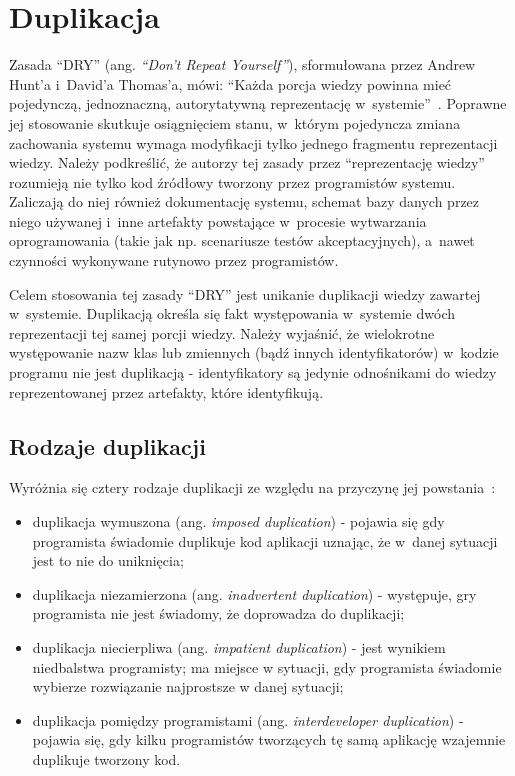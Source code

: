 \chapter{Duplikacja} \label{chap:duplication}

Zasada ``DRY'' (ang. \emph{``Don't Repeat Yourself''}), sformułowana przez Andrew Hunt'a i~David'a Thomas'a, mówi: ``Każda porcja wiedzy powinna mieć pojedynczą, jednoznaczną, autorytatywną reprezentację w~systemie''~\cite{prag_prog:dupl}.
Poprawne jej stosowanie skutkuje osiągnięciem stanu, w~którym pojedyncza zmiana zachowania systemu wymaga modyfikacji tylko jednego fragmentu reprezentacji wiedzy.
Należy podkreślić, że autorzy tej zasady przez ``reprezentację wiedzy'' rozumieją nie tylko kod źródłowy tworzony przez programistów systemu.
Zaliczają do niej również dokumentację systemu, schemat bazy danych przez niego używanej i~inne artefakty powstające w~procesie wytwarzania oprogramowania (takie jak np. scenariusze testów akceptacyjnych), a~nawet czynności wykonywane rutynowo przez programistów.

Celem stosowania tej zasady ``DRY'' jest unikanie duplikacji wiedzy zawartej w~systemie.
Duplikacją określa się fakt występowania w~systemie dwóch reprezentacji tej samej porcji wiedzy.
Należy wyjaśnić, że wielokrotne występowanie nazw klas lub zmiennych (bądź innych identyfikatorów) w~kodzie programu nie jest duplikacją - identyfikatory są jedynie odnośnikami do wiedzy reprezentowanej przez artefakty, które identyfikują.



\section{Rodzaje duplikacji}

Wyróżnia się cztery rodzaje duplikacji ze względu na przyczynę jej powstania~\cite{prag_prog:dupl}:

\begin{itemize}
 \item duplikacja wymuszona (ang. \emph{imposed duplication}) - pojawia się gdy programista świadomie duplikuje kod aplikacji uznając, że w~danej sytuacji jest to nie do uniknięcia;
 \item duplikacja niezamierzona (ang. \emph{inadvertent duplication}) - występuje, gry programista nie jest świadomy, że doprowadza do duplikacji;
 \item duplikacja niecierpliwa (ang. \emph{impatient duplication}) - jest wynikiem niedbalstwa programisty; ma miejsce w sytuacji, gdy programista świadomie wybierze rozwiązanie najprostsze w danej sytuacji;
 \item duplikacja pomiędzy programistami (ang. \emph{interdeveloper duplication}) - pojawia się, gdy kilku programistów tworzących tę samą aplikację wzajemnie duplikuje tworzony kod.
\end{itemize}

